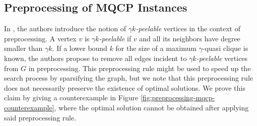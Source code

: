 \documentclass[draft,final]{vutinfth} %
\begin{document}
\subsection{Preprocessing of MQCP Instances}

In \cite{Abello2002}, the authors introduce the notion of $\gamma k$\emph{-peelable} vertices in the context of preprocessing. A vertex $v$ is $\gamma k$\emph{-peelable} if $v$ and all its neighbors have degree smaller than $\gamma k$. If a lower bound $k$ for the size of a maximum $\gamma$-quasi clique is known, the authors propose to remove all edges incident to $\gamma k$\emph{-peelable} vertices from $G$ in preprocessing. This preprocessing rule might be used to speed up the search process by sparsifying the graph, but we note that this preprocessing rule does not necessarily preserve the existence of optimal solutions. We prove this claim by giving a counterexample in Figure \ref{fig:preprocessing-mqcp-counterexample}, where the optimal solution cannot be obtained after applying said preprocessing rule. 
\end{document}
